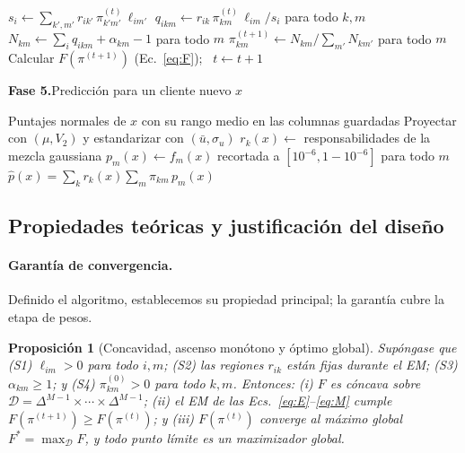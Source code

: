 \documentclass[11pt,a4paper]{article}
\newtheorem{proposition}{Proposición}
\newcommand{\AlgFase}[2]{\Statex\vspace{-1pt}\colorbox{algfondo}{\parbox{\dimexpr\linewidth-2\fboxsep\relax}{\color{algazul}\rule{0pt}{2.3ex}\textbf{Fase #1.}\enspace #2}}}
\begin{document}
\begin{algorithm}[t]
\begin{algorithmic}[1]
   
    \State $s_i\gets\sum_{k',m'}r_{ik'}\,\pi^{(t)}_{k'm'}\,\ell_{im'}$
    \State $q_{ikm}\gets r_{ik}\,\pi^{(t)}_{km}\,\ell_{im}/s_i$ para todo $k,m$
  \EndFor
   
    \State $N_{km}\gets\sum_i q_{ikm}+\alpha_{km}-1$ para todo $m$
    \State $\pi^{(t+1)}_{km}\gets N_{km}\big/\sum_{m'}N_{km'}$ para todo $m$
  \EndFor
  \State Calcular $F(\pi^{(t+1)})$ (Ec.~\ref{eq:F}); \ $t\gets t+1$
\AlgFase{5}{Predicción para un cliente nuevo $x$}
\State Puntajes normales de $x$ con su rango medio en las columnas guardadas 
\State Proyectar con $(\mu,V_2)$ y estandarizar con $(\bar u,\sigma_u)$
\State $r_k(x)\gets$ responsabilidades de la mezcla gaussiana
\State $p_m(x)\gets f_m(x)$ recortada a $[10^{-6},1-10^{-6}]$ para todo $m$
\State \Return $\hat p(x)=\sum_k r_k(x)\sum_m\pi_{km}\,p_m(x)$
\end{algorithmic}
\end{algorithm}

\subsection{Propiedades teóricas y justificación del diseño}
\paragraph{Garantía de convergencia.} Definido el algoritmo, establecemos su propiedad principal; la garantía cubre la etapa de pesos.

\begin{proposition}[Concavidad, ascenso monótono y óptimo global]\label{prop:mapem}
Supóngase que (S1) $\ell_{im}>0$ para todo $i,m$; (S2) las regiones $r_{ik}$ están fijas durante el EM; (S3) $\alpha_{km}\ge1$; y (S4) $\pi^{(0)}_{km}>0$ para todo $k,m$. Entonces: (i) $F$ es cóncava sobre $\mathcal D=\Delta^{M-1}\times\cdots\times\Delta^{M-1}$; (ii) el EM de las Ecs.~\eqref{eq:E}--\eqref{eq:M} cumple $F(\pi^{(t+1)})\ge F(\pi^{(t)})$; y (iii) $F(\pi^{(t)})$ converge al máximo global $F^\ast=\max_{\mathcal D}F$, y todo punto límite es un maximizador global.
\end{proposition}
\end{document}
